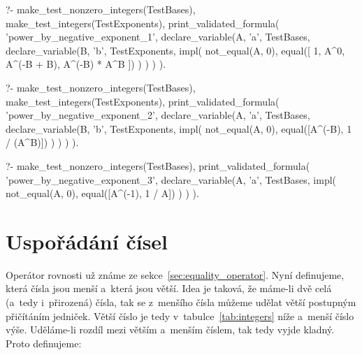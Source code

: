 \begin{prolog}
?-	make_test_nonzero_integers(TestBases),
	make_test_integers(TestExponents),
	print_validated_formula(
		'power_by_negative_exponent_1',
		declare_variable(A, 'a', TestBases,
			declare_variable(B, 'b', TestExponents,
				impl(
					not_equal(A, 0),
					equal([
						1,
						A^0,
						A^(-B + B),
						A^(-B) * A^B
					])
				)
			)
		)
	).
\end{prolog}
\begin{prolog}
?-	make_test_nonzero_integers(TestBases),
	make_test_integers(TestExponents),
	print_validated_formula(
		'power_by_negative_exponent_2',
		declare_variable(A, 'a', TestBases,
			declare_variable(B, 'b', TestExponents,
				impl(
					not_equal(A, 0),
					equal([A^(-B), 1 / (A^B)])
				)
			)
		)
	).
\end{prolog}
\begin{prolog}
?-	make_test_nonzero_integers(TestBases),
	print_validated_formula(
		'power_by_negative_exponent_3',
		declare_variable(A, 'a', TestBases,
			impl(
				not_equal(A, 0),
				equal([A^(-1), 1 / A])
			)
		)
	).
\end{prolog}

\section{Uspořádání čísel}

Operátor rovnosti už známe ze sekce~\ref{sec:equality_operator}. Nyní definujeme, která čísla jsou menší a~která jsou větší. Idea je taková, že máme-li dvě celá (a~tedy i~přirozená) čísla, tak se z~menšího čísla můžeme udělat větší postupným přičítáním jedniček. Větší číslo je tedy v~tabulce~\ref{tab:integers} níže a~menší číslo výše. Uděláme-li rozdíl mezi větším a~menším číslem, tak tedy vyjde kladný. Proto definujeme:

